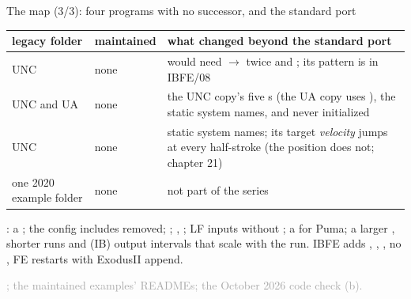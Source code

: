 \documentclass[aspectratio=169,11pt]{beamer}
\newcommand{\sourcecredit}[1]{\vfill\begin{flushright}\tiny\textcolor{DarkGray}{#1}\end{flushright}}
\begin{document}
\begin{frame}{The map (3/3): four programs with no successor, and the standard port}
\label{fr:map3}
\tiny
\renewcommand{\arraystretch}{1.0}
\setlength{\tabcolsep}{4pt}
\begin{tabular}{@{}L{0.35\textwidth}L{0.12\textwidth}L{0.47\textwidth}@{}}
\toprule
legacy folder & maintained & what changed beyond the standard port \\
\midrule
UNC  & none & would need  $\to$  twice and ; its pattern is in IBFE/08 \\
UNC and UA  & none & the UNC copy's five s (the UA copy uses ), the static system names, and  never initialized \\
UNC  & none & static system names; its target \emph{velocity} jumps at every half-stroke (the position does not; chapter 21) \\
one 2020 example folder & none & not part of the series \\
\bottomrule
\end{tabular}

\vspace{1mm}
\footnotesize {}: a ; the config includes removed; ; , ; LF inputs without \code{//}; a  for Puma; a larger , shorter runs and (IB) output intervals that scale with the run. IBFE adds , , , no , FE restarts with ExodusII append.
\sourcecredit{; the maintained examples' READMEs; the October 2026 code check (b).}
\end{frame}
\end{document}
